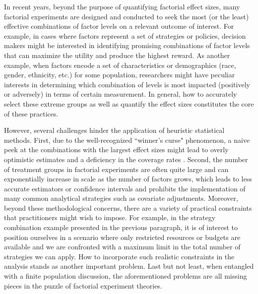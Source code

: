 \documentclass[12pt]{article}
\begin{document}
In recent years, beyond the purpose of quantifying factorial effect sizes, many factorial experiments are designed and conducted to seek the most (or the least) effective combinations of factor levels on a relevant outcome of interest. For example, in cases where factors represent a set of strategies or policies, decision makers might be interested in identifying promising combinations of factor levels that can maximize the utility and produce the highest reward. As another example, when factors encode a set of characteristics or demographics (race, gender, ethnicity, etc.) for some population, researchers might have peculiar interests in determining which combination of levels is most impacted (positively or adversely) in terms of certain measurement. In general, how to accurately select these extreme groups as well as quantify the effect sizes constitutes the core of these practices. 

However, several challenges hinder the application of heuristic statistical methods. First, due to the well-recognized ``winner's curse" phenomenon, a naive peek at the combinations with the largest effect sizes might lead to overly optimistic estimates and a deficiency in the coverage rates \citep{lee2018winner, andrews2019inference}. Second, the number of treatment groups in factorial experiments are often quite large and can exponentially increase in scale as the number of factors grows, which leads to less accurate estimators or confidence intervals and prohibits the implementation of many common analytical strategies such as covariate adjustments. Moreover, beyond these methodological concerns, there are a variety of practical constraints that practitioners might wish to impose. For example, in the strategy combination example presented in the previous paragraph, it is of interest to position ourselves in a scenario where only restricted resources or budgets are available and we are confronted with a maximum limit in the total number of strategies we can apply. How to incorporate such realistic constraints in the analysis stands as another important problem. Last but not least, when entangled with a finite population discussion, the aforementioned problems are all missing pieces in the puzzle of factorial experiment theories. 
\end{document}
